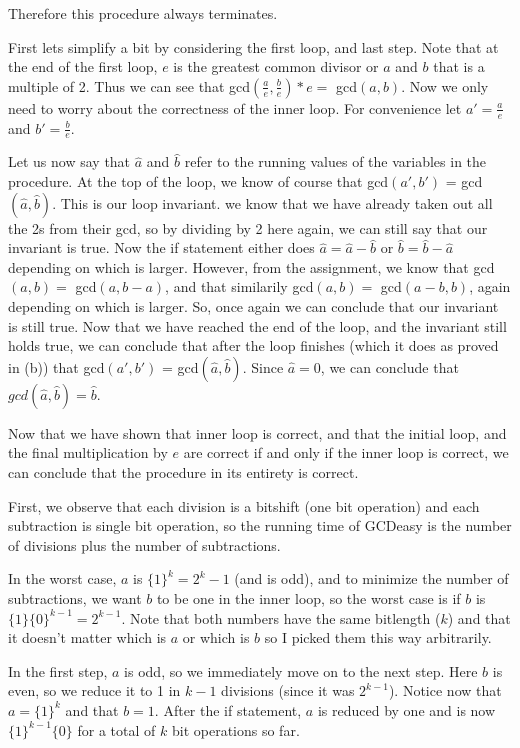 \documentclass[12pt]{article}
\begin{document}
\begin{list}{.}{}
\begin{list}{)}{}
Therefore this procedure always terminates.

\item First lets simplify a bit by considering the first loop, and last step.
Note that at the end of the first loop, $e$ is the greatest common divisor or
$a$ and $b$ that is a multiple of 2.  Thus we can see that
gcd$(\frac{a}{e},\frac{b}{e}) * e = $ gcd$(a,b)$.  Now we only need to worry
about the correctness of the inner loop.  For convenience let $a' = \frac{a}{e}$
and $b' = \frac{b}{e}$.

Let us now say that $\hat a$ and $\hat b$ refer to the running values of the
variables in the procedure.  At the top of the loop, we know of course that
gcd$(a',b')$ = gcd$(\hat a,\hat b)$.  This is our loop invariant.
we know that we have already taken out all the 2s from their gcd, so by dividing
by 2 here again, we can still say that our invariant is true.  Now the if
statement either does $\hat a = \hat a - \hat b$ or $\hat b = \hat b - \hat a$
depending on which is larger.  However, from the assignment, we know that
gcd$(a,b) = $ gcd$(a, b-a)$, and that similarily gcd$(a,b) = $ gcd$(a-b,b)$,
again depending on which is larger.  So, once again we can conclude that our
invariant is still true.  Now that we have reached the end of the loop, and the
invariant still holds true, we can conclude that after the loop finishes (which
it does as proved in (b)) that gcd$(a',b')$ = gcd$(\hat a,\hat b)$.  Since $\hat
a = 0$, we can conclude that $gcd(\hat a, \hat b) = \hat b$.

Now that we have shown that inner loop is correct, and that the initial loop,
and the final multiplication by $e$ are correct if and only if the inner loop is
correct, we can conclude that the procedure in its entirety is correct.

\item First, we observe that each division is a bitshift (one bit operation) and
each subtraction is single bit operation, so the running time of GCDeasy is the
number of divisions plus the number of subtractions.

In the worst case, $a$ is $\{1\}^k = 2^{k}-1$ (and is odd), and to minimize the
number of subtractions, we want $b$ to be one in the inner loop, so the worst
case is if $b$ is $\{1\}\{0\}^{k-1} = 2^{k-1}$.  Note that both numbers have the
same bitlength ($k$) and that it doesn't matter which is $a$ or which is $b$ so
I picked them this way arbitrarily.

In the first step, $a$ is odd, so we immediately move on to the next step.  Here
$b$ is even, so we reduce it to 1 in $k-1$ divisions (since it was $2^{k-1}$).
Notice now that $a = \{1\}^k$ and that $b = 1$.  After the if statement, $a$ is
reduced by one and is now $\{1\}^{k-1}\{0\}$ for a total of $k$ bit operations
so far.


\end{list}
\end{list}
\end{document}

